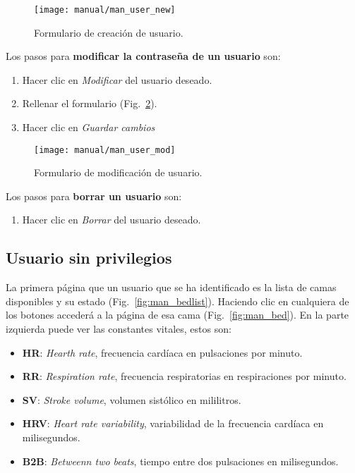 \begin{figure}
	\centering
	\texttt{[image: manual/man\_user\_new]}
	\caption{Formulario de creación de usuario.}
	\label{fig:man_new_user}
\end{figure}

Los pasos para \textbf{modificar la contraseña de un usuario} son:
\begin{enumerate}
	\item Hacer clic en \textit{Modificar} del usuario deseado.
	\item Rellenar el formulario (Fig.~\ref{fig:man_mod_user}).
	\item Hacer clic en \textit{Guardar cambios}
\end{enumerate}

\begin{figure}
	\centering
	\texttt{[image: manual/man\_user\_mod]}
	\caption{Formulario de modificación de usuario.}
	\label{fig:man_mod_user}
\end{figure}

Los pasos para \textbf{borrar un usuario} son:
\begin{enumerate}
	\item Hacer clic en \textit{Borrar} del usuario deseado.
\end{enumerate}

\subsection{Usuario sin privilegios}\label{sec:normal_tuto}

La primera página que un usuario que se ha identificado es la lista de camas disponibles y su estado (Fig.~\ref{fig:man_bedlist}). Haciendo clic en cualquiera de los botones accederá a la página de esa cama (Fig.~\ref{fig:man_bed}). En la parte izquierda puede ver las constantes vitales, estos son:
\begin{itemize}
	\item \textbf{HR}: \textit{Hearth rate}, frecuencia cardíaca en pulsaciones por minuto.
	\item \textbf{RR}: \textit{Respiration rate}, frecuencia respiratorias en respiraciones por minuto.
	\item \textbf{SV}: \textit{Stroke volume}, volumen sistólico en mililitros.
	\item \textbf{HRV}: \textit{Heart rate variability}, variabilidad de la frecuencia cardíaca en milisegundos.
	\item \textbf{B2B}: \textit{Betweenn two beats}, tiempo entre dos pulsaciones en milisegundos.
\end{itemize}

